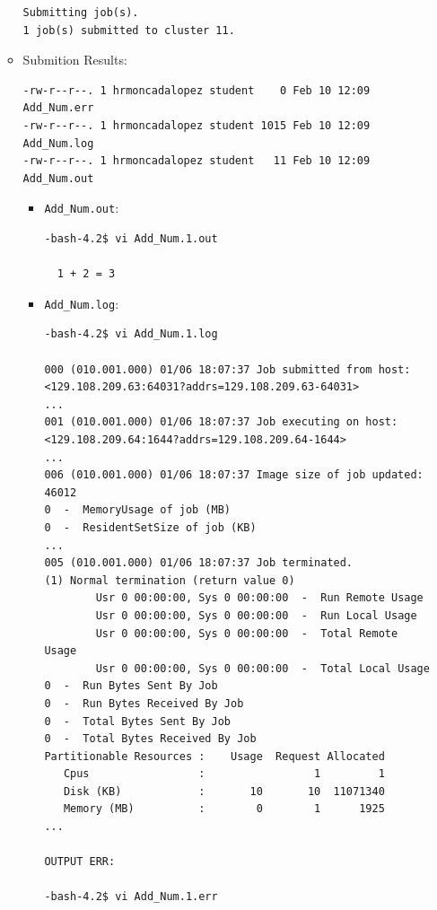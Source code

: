 \documentclass{article}
\begin{document}
\begin{enumerate}
\begin{itemize}
\begin{verbatim}
Submitting job(s).
1 job(s) submitted to cluster 11.
\end{verbatim}
\normalsize
\item Submition Results:
\scriptsize\begin{verbatim}
-rw-r--r--. 1 hrmoncadalopez student    0 Feb 10 12:09 Add_Num.err
-rw-r--r--. 1 hrmoncadalopez student 1015 Feb 10 12:09 Add_Num.log
-rw-r--r--. 1 hrmoncadalopez student   11 Feb 10 12:09 Add_Num.out
\end{verbatim}
\normalsize
\begin{itemize}
\item\verb+Add_Num.out+:
\scriptsize\begin{verbatim}
-bash-4.2$ vi Add_Num.1.out

  1 + 2 = 3
\end{verbatim}
\normalsize
\item \verb+Add_Num.log+:
\scriptsize\begin{verbatim}
-bash-4.2$ vi Add_Num.1.log

000 (010.001.000) 01/06 18:07:37 Job submitted from host: <129.108.209.63:64031?addrs=129.108.209.63-64031>
...
001 (010.001.000) 01/06 18:07:37 Job executing on host: <129.108.209.64:1644?addrs=129.108.209.64-1644>
...
006 (010.001.000) 01/06 18:07:37 Image size of job updated: 46012
0  -  MemoryUsage of job (MB)
0  -  ResidentSetSize of job (KB)
...
005 (010.001.000) 01/06 18:07:37 Job terminated.
(1) Normal termination (return value 0)
        Usr 0 00:00:00, Sys 0 00:00:00  -  Run Remote Usage
        Usr 0 00:00:00, Sys 0 00:00:00  -  Run Local Usage
        Usr 0 00:00:00, Sys 0 00:00:00  -  Total Remote Usage
        Usr 0 00:00:00, Sys 0 00:00:00  -  Total Local Usage
0  -  Run Bytes Sent By Job
0  -  Run Bytes Received By Job
0  -  Total Bytes Sent By Job
0  -  Total Bytes Received By Job
Partitionable Resources :    Usage  Request Allocated
   Cpus                 :                 1         1
   Disk (KB)            :       10       10  11071340
   Memory (MB)          :        0        1      1925
...

OUTPUT ERR:

-bash-4.2$ vi Add_Num.1.err
\end{verbatim}
\normalsize
\end{itemize}
\end{itemize}
\end{enumerate}
\end{document}

